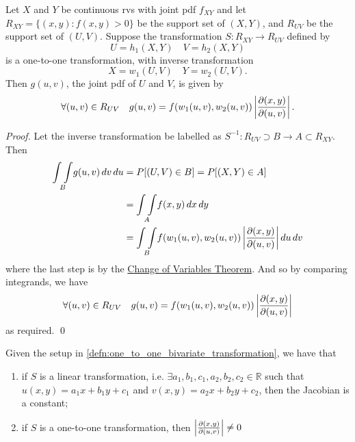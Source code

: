 \documentclass[notoc,notitlepage]{tufte-book}
\begin{document}
\begin{thm}
\label{thm:one_to_one_bivariate_transformations}
   Let $X$ and $Y$ be continuous rvs with joint pdf $f_{XY}$ and let $R_{XY} = \{( x, y ) : f(x, y) > 0\}$ be the support set of $(X, Y)$, and $R_{UV}$ be the support set of $(U, V)$. Suppose the transformation $S: R_{XY} \to R_{UV}$ defined by
  \begin{equation*}
    U = h_1(X, Y) \quad V = h_2(X, Y)
  \end{equation*}
  is a one-to-one transformation, with inverse transformation
  \begin{equation*}
    X = w_1(U, V) \quad Y = w_2(U, V).
  \end{equation*}
  Then $g(u, v)$, the joint pdf of $U$ and $V$, is given by
  \begin{equation*}
    \forall (u, v) \in R_{UV} \quad g(u, v) = f(w_1(u,v), w_2(u,v)) \left| \frac{\partial (x, y)}{\partial (u, v)} \right|.
  \end{equation*}
\end{thm}

\begin{proof}
  Let the inverse transformation be labelled as $S^{-1} : R_{UV} \supset B \to A \subset R_{XY}$. Then
  \begin{align*}
    \underset{B}{\int\int} g(u, v) \mathop{}\!d{v} \mathop{}\!d{u}
      &= P[ (U, V) \in B ] = P[ (X, Y) \in A ] \\
      &= \underset{A}{\int\int} f(x, y) \mathop{}\!d{x} \mathop{}\!d{y} \\
      &= \underset{B}{\int\int} f( w_1 (u, v), w_2 (u, v) ) \left| \frac{\partial (x, y)}{\partial (u, v)} \right| \mathop{}\!d{u} \mathop{}\!d{v}
  \end{align*}
  where the last step is by the \href{http://mathworld.wolfram.com/ChangeofVariablesTheorem.html}{Change of Variables Theorem}. And so by comparing integrands, we have
  \begin{equation*}
    \forall (u, v) \in R_{UV} \quad g(u, v) = f(w_1(u,v), w_2(u,v)) \left| \frac{\partial (x, y)}{\partial (u, v)} \right|
  \end{equation*}
  as required. \qed
\end{proof}

\begin{propo}
\label{propo:properties_of_the_jacobian}
Given the setup in \cref{defn:one_to_one_bivariate_transformation}, we have that \begin{enumerate}
    \item if $S$ is a linear transformation, i.e. $\exists a_1, b_1, c_1, a_2, b_2, c_2 \in \mathbb{R}$ such that $u(x, y) = a_1 x + b_1 y + c_1$ and $v(x, y) = a_2 x + b_2 y + c_2$, then the Jacobian is a constant;
    \item if $S$ is a one-to-one transformation, then $\left|\frac{\partial(x, y)}{\partial (u, v)}\right| \neq 0$
  \end{enumerate}
\end{propo}
\end{document}

